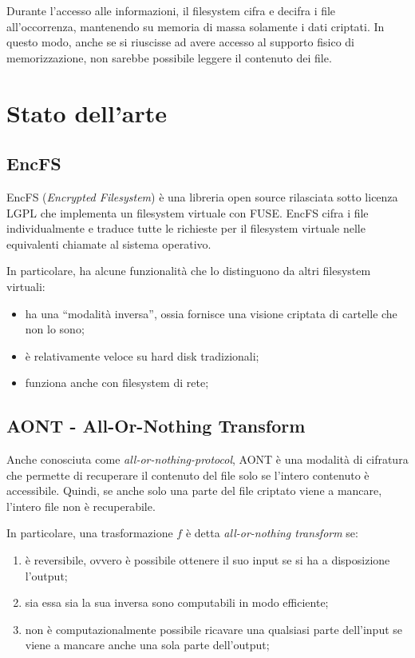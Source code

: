 \documentclass[a4paper,12pt,twoside,openright]{report}
\begin{document}
  Durante l'accesso alle informazioni, il filesystem cifra e decifra i file all'occorrenza,
  mantenendo su memoria di massa solamente i dati criptati.
  In questo modo, anche se si riuscisse ad avere accesso al supporto fisico di memorizzazione,
  non sarebbe possibile leggere il contenuto dei file.

  \section{Stato dell'arte}
  \subsection{EncFS}
  EncFS (\textit{Encrypted Filesystem}) \cite{encfsgithub} è una libreria open source
  rilasciata sotto licenza LGPL che implementa un filesystem virtuale con FUSE.
  EncFS cifra i file individualmente e traduce tutte le richieste per il filesystem virtuale nelle equivalenti chiamate
  al sistema operativo.

  In particolare, ha alcune funzionalità che lo distinguono da altri filesystem virtuali:
  \begin{itemize}
    \item ha una ``modalità inversa'', ossia fornisce una visione criptata di cartelle che non lo sono;
    \item è relativamente veloce su hard disk tradizionali;
    \item funziona anche con filesystem di rete;
  \end{itemize}

  \subsection{AONT - All-Or-Nothing Transform}
  Anche conosciuta come \textit{all-or-nothing-protocol}, AONT \cite{aontpaper} è una modalità di cifratura che permette
  di recuperare il contenuto del file solo se l'intero contenuto è accessibile.
  Quindi, se anche solo una parte del file criptato viene a mancare, l'intero file non è recuperabile.

  In particolare, una trasformazione $f$ è detta \textit{all-or-nothing transform} se:
  \begin{enumerate}
    \item è reversibile, ovvero è possibile ottenere il suo input se si ha a disposizione l'output;
    \item sia essa sia la sua inversa sono computabili in modo efficiente;
    \item non è computazionalmente possibile ricavare una qualsiasi parte dell'input se viene a mancare anche una sola parte dell'output;
  \end{enumerate}
\end{document}
